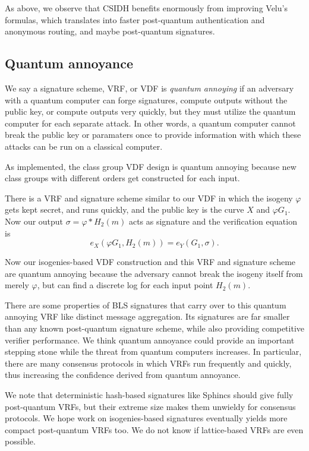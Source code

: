 \documentclass{article}
\newcommand\mathperiod{.}
\begin{document}
As above, we observe that CSIDH \cite{10.1007/978-3-030-03332-3_15} benefits enormously from
improving Velu's formulas, which translates into faster post-quantum
authentication and anonymous routing, and maybe post-quantum signatures.

\subsection{Quantum annoyance}

We say a signature scheme, VRF, or VDF is {\em quantum annoying} if
an adversary with a quantum computer can forge signatures, compute
outputs without the public key, or compute outputs very quickly,
but they must utilize the quantum computer for each separate attack.
In other words, a quantum computer cannot break the public key or
paramaters once to provide information with which these attacks can
be run on a classical computer. 

As implemented, the class group VDF design is quantum annoying because
new class groups with different orders get constructed for each input.

There is a VRF and signature scheme similar to our VDF in which the
isogeny $φ$ gets kept secret, and runs quickly, and the public key
is the curve $X$ and $φ G_1$.  Now our output $\sigma = φ* H_2(m)$
acts as signature and the verification equation is 
$$ e_X( φ G_1, H_2(m) ) = e_Y( G_1, \sigma ) \mathperiod $$

Now our isogenies-based VDF construction and this VRF and signature
scheme are quantum annoying because the adversary cannot break the
isogeny itself from merely $φ$, but can find a discrete log for each
input point $H_2(m)$.

There are some properties of BLS signatures that carry over to this
quantum annoying VRF like distinct message aggregation.  
Its signatures are far smaller than any known post-quantum signature
scheme, while also providing competitive verifier performance.  
We think quantum annoyance could provide an important stepping stone
while the threat from quantum computers increases.  In particular,
there are many consensus protocols in which VRFs run frequently and
quickly, thus increasing the confidence derived from quantum annoyance.  

We note that deterministic hash-based signatures like Sphincs should
give fully post-quantum VRFs, but their extreme size makes them
unwieldy for consensus protocols.  We hope work on isogenies-based
signatures eventually yields more compact post-quantum VRFs too.
We do not know if lattice-based VRFs are even possible.
\end{document}
